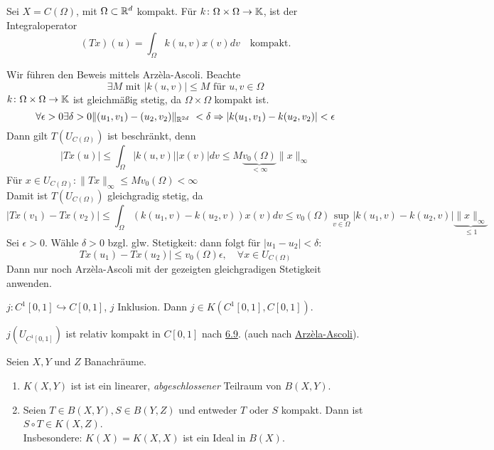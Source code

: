 \begin{beispiel} \label{bsp:7.3}
	Sei $X = C(\Omega)$, mit $\Omega \subset \mathbb{R}^{d}$ kompakt. Für $k \colon \Omega \times \Omega \rightarrow \mathbb{K}$, ist der Integraloperator
	\[ (Tx)(u) = \int_{\Omega} k(u, v) x(v) dv \quad \text{kompakt.} \]
	\begin{beweis}
		Wir führen den Beweis mittels Arzèla-Ascoli. Beachte
		\[ \exists M \text{ mit } |k(u, v)| \leq M \text{ für } u, v \in \Omega \]
		$k \colon \Omega \times \Omega \rightarrow \mathbb{K}$ ist gleichmä{\ss}ig stetig, da $\Omega \times \Omega$ kompakt ist.
		\[ \forall \epsilon > 0 \exists \delta > 0 \| (u_1, v_1) - (u_2, v_2) \|_{\MdR^{2d}} < \delta \Rightarrow |k(u_1, v_1) - k(u_2, v_2)| < \epsilon \]
		Dann gilt $T(U_{C(\Omega)})$ ist beschränkt, denn
		\[ |Tx(u)| \leq \int_{\Omega} |k(u, v)| |x(v)| dv \leq M \underbrace{v_{0}(\Omega)}_{< \infty} \| x \|_{\infty} \]
		Für $x \in U_{C(\Omega)}: \| Tx \|_{\infty} \leq M v_{0}(\Omega) < \infty$ \\
		Damit ist $T(U_{C(\Omega)})$ gleichgradig stetig, da
		\[ |Tx(v_1) - Tx(v_2)| \leq \int_{\Omega} \left( k(u_1, v) - k(u_2, v) \right) x(v) dv \leq v_{0}(\Omega) \sup_{v \in \Omega} | k(u_1, v) - k(u_2, v) | \underbrace{\| x \|_{\infty}}_{ \leq 1 } \]
		Sei $\epsilon > 0$. Wähle $\delta > 0$ bzgl. glw. Stetigkeit: dann folgt für 	$|u_1 - u_2| < \delta$:
		\[ Tx(u_1) - Tx(u_2) | \leq v_{0}(\Omega) \epsilon, \quad \forall x \in U_{C(\Omega)} \]
		Dann nur noch Arzèla-Ascoli mit der gezeigten gleichgradigen Stetigkeit anwenden.
	\end{beweis}
\end{beispiel}


\begin{beispiel} \label{bsp:7.4}
	$j \colon C^{1}[0, 1] \hookrightarrow C[0, 1]$, $j$ Inklusion. Dann $j \in K(C^{1}[0, 1], C[0, 1])$.
	\begin{beweis}
		$j(U_{C^{1}[0, 1]})$ ist relativ kompakt in $C[0, 1]$ nach \hyperref[]{6.9}. (auch nach \hyperref[satz-6.7-arzelaascoli]{Arzèla-Ascoli}).
	\end{beweis}
\end{beispiel}


\begin{satz} \label{satz:7-5}
	Seien $X, Y$ und $Z$ Banachräume.
	\begin{enumerate}[label=\alph*\upshape)]
		\label{satz:7-5a}
		\item $K(X, Y)$ ist ist ein linearer, \textit{abgeschlossener} Teilraum von $B(X, Y)$.
		\item Seien $T \in B(X, Y), S \in B(Y, Z)$ und entweder $T$ oder $S$ kompakt. Dann ist $S \circ T \in K(X, Z)$. \\
			Insbesondere: $K(X) = K(X, X)$ ist ein Ideal in $B(X)$.
	\end{enumerate}
\end{satz}

